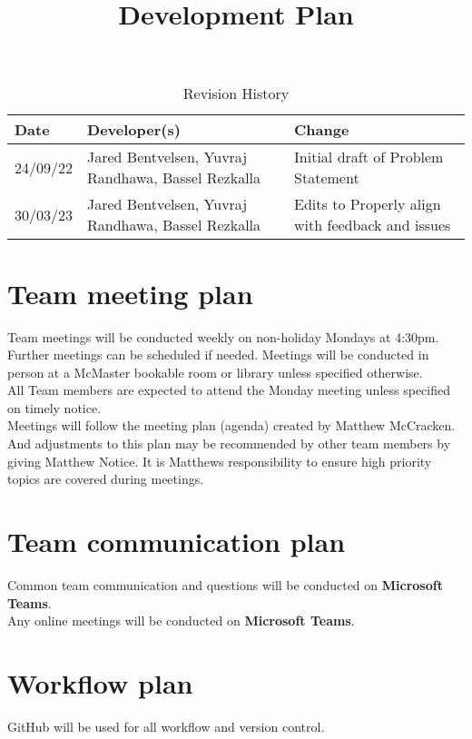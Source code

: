 \documentclass{article}
\title{Development Plan\\\progname}
\author{\authname}
\date{}
\begin{document}
	
	\maketitle
	
	\begin{table}[hp]
		\caption{Revision History} \label{TblRevisionHistory}
		\begin{tabularx}{\textwidth}{|X|X|X|}
			\toprule
			\textbf{Date} & \textbf{Developer(s)} & \textbf{Change}\\
			\midrule
			24/09/22 & Jared Bentvelsen, Yuvraj Randhawa, Bassel Rezkalla & Initial draft of Problem Statement\\
			\midrule
			30/03/23 & Jared Bentvelsen, Yuvraj Randhawa, Bassel Rezkalla & Edits to Properly align with feedback and issues\\
			\bottomrule
		\end{tabularx}
	\end{table}
	
	
	\section{Team meeting plan}
	Team meetings will be conducted weekly on non-holiday Mondays at 4:30pm.
	Further meetings can be scheduled if needed.
	Meetings will be conducted in person at a McMaster bookable room or library unless specified otherwise.\\
	All Team members are expected to attend the Monday meeting unless specified on timely notice.\\
	Meetings will follow the meeting plan (agenda) created by Matthew McCracken. And adjustments to this plan may be recommended by other team members by giving Matthew Notice. It is Matthews responsibility to ensure high priority topics are covered during meetings.
	
	\section{Team communication plan}
	Common team communication and questions will be conducted on \textbf{Microsoft Teams}.\\
	Any online meetings will be conducted on \textbf{Microsoft Teams}. \\
	
	\section{Workflow plan}
	GitHub will be used for all workflow and version control.
	
\end{document}
